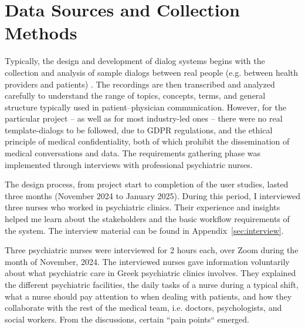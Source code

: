 \section{Data Sources and Collection Methods}
Typically, the design and development of dialog systems begins with the collection and analysis of sample dialogs between real people (e.g. between health providers and patients) \cite{BickmoreGiorgino2006}. The recordings are then transcribed and analyzed carefully to understand the range of topics, concepts, terms, and general structure typically used in patient–physician communication. However, for the particular project -- as well as for most industry-led ones -- there were no real template-dialogs to be followed, due to GDPR regulations, and the ethical principle of medical confidentiality, both of which prohibit the dissemination of medical conversations and data. The requirements gathering phase was implemented through interviews with professional psychiatric nurses.

The design process, from project start to completion of the user studies, lasted three months (November 2024 to January 2025). During this period, I interviewed three nurses who worked in psychiatric clinics. Their experience and insights helped me learn about the stakeholders and the basic workflow requirements of the system. The interview material can be found in Appendix~\ref{sec:interview}.

Three psychiatric nurses were interviewed for 2 hours each, over Zoom during the month of November, 2024. The interviewed nurses gave information voluntarily about what psychiatric care in Greek psychiatric clinics involves. They explained the different psychiatric facilities, the daily tasks of a nurse during a typical shift, what a nurse should pay attention to when dealing with patients, and how they collaborate with the rest of the medical team, i.e. doctors, psychologists, and social workers. From the discussions, certain ``pain points`` emerged. 

